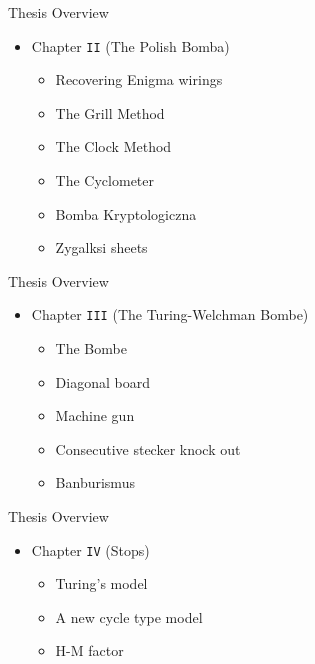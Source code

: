 \documentclass[hyphens,aspectratio=169]{beamer}
\begin{document}
\begin{frame}[fragile]{Thesis Overview}
	\begin{itemize}
		\item Chapter \texttt{II} (The Polish Bomba)
		      \begin{itemize}
			      \item Recovering Enigma wirings
			      \item The Grill Method
			      \item The Clock Method
			      \item The Cyclometer
			      \item Bomba Kryptologiczna
			      \item Zygalksi sheets
		      \end{itemize}
	\end{itemize}

\end{frame}


\begin{frame}[fragile]{Thesis Overview}
	\begin{itemize}
		\item Chapter \texttt{III} (The Turing-Welchman Bombe)
		      \begin{itemize}
			      \item The Bombe
			      \item Diagonal board
			      \item Machine gun
			      \item Consecutive stecker knock out
			      \item Banburismus
		      \end{itemize}
	\end{itemize}

\end{frame}

\begin{frame}[fragile]{Thesis Overview}
	\begin{itemize}
		\item Chapter \texttt{IV} (Stops)
		      \begin{itemize}
			      \item Turing's model
			      \item A new cycle type model
			      \item H-M factor
		      \end{itemize}
	\end{itemize}

\end{frame}
\end{document}
